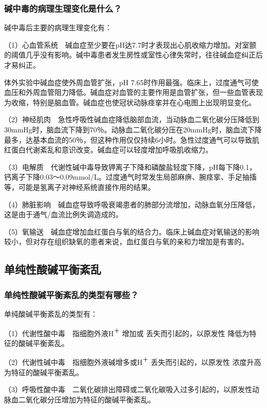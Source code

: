 \subsubsection{碱中毒的病理生理变化是什么？}

碱中毒后主要的病理生理变化有：

（1）心血管系统　碱血症至少要在pH达7.7时才表现出心肌收缩力增加。对室颤的阈值几乎没有影响。碱中毒患者发生房性或室性心律失常时，往往碱血症纠正后才易纠正。

体外实验中碱血症使外周血管扩张，pH
7.65时作用最强。临床上，过度通气可使血压和外周血管阻力降低。碱血症对血管的主要作用是血管扩张，但一些血管表现为收缩，特别是脑血管。碱血症也使冠状动脉痉挛并在心电图上出现明显变化。

（2）神经肌肉　急性呼吸性碱血症降低脑部血流，当动脉血二氧化碳分压降低到30mmHg时，脑血流下降到70％。动脉血二氧化碳分压在20mmHg时，脑血流下降最多，达基本血流的50％，但这种作用仅仅持续6小时。急性过度通气可以导致肌红蛋白代谢紊乱和意识改变。碱血症可以轻度增加呼吸肌收缩力。

（3）电解质　代谢性碱中毒导致钾离子下降和磷酸盐轻度下降，pH每下降0.1，钙离子下降0.03～0.09mmol/L。过度通气时常发生局部麻痹、腕痉挛、手足抽搐等，可能是氢离子对神经系统直接作用的结果。

（4）肺脏影响　碱血症导致呼吸衰竭患者的肺部分流增加，动脉血氧分压降低，这是由于通气/血流比例失调造成的。

（5）氧输送　碱血症增加血红蛋白与氧的结合力。临床上碱血症对氧输送的影响较小，但对存在组织缺氧的患者来说，血红蛋白与氧的亲和力增加是有害的。

\subsection{单纯性酸碱平衡紊乱}

\subsubsection{单纯性酸碱平衡紊乱的类型有哪些？}

单纯酸碱平衡紊乱的类型有：

（1）代谢性酸中毒　指细胞外液H\textsuperscript{＋}
增加或
丢失而引起的，以原发性
降低为特征的酸碱平衡紊乱。

（2）代谢性碱中毒　指细胞外液碱增多或H\textsuperscript{＋}
丢失而引起的，以原发性
浓度升高为特征的酸碱平衡紊乱。

（3）呼吸性酸中毒　二氧化碳排出障碍或二氧化碳吸入过多引起的，以原发性动脉血二氧化碳分压增加为特征的酸碱平衡紊乱。

